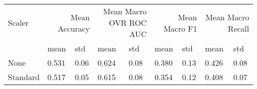 \begin{tabular}{lllllllll}
\toprule
Scaler & \multicolumn{2}{r}{Mean Accuracy} & \multicolumn{2}{r}{Mean Macro OVR ROC AUC} & \multicolumn{2}{r}{Mean Macro F1} & \multicolumn{2}{r}{Mean Macro Recall} \\
 & mean & std & mean & std & mean & std & mean & std \\
\midrule
None & 0.531 & 0.06 & 0.624 & 0.08 & 0.380 & 0.13 & 0.426 & 0.08 \\
Standard & 0.517 & 0.05 & 0.615 & 0.08 & 0.354 & 0.12 & 0.408 & 0.07 \\
\bottomrule
\end{tabular}
